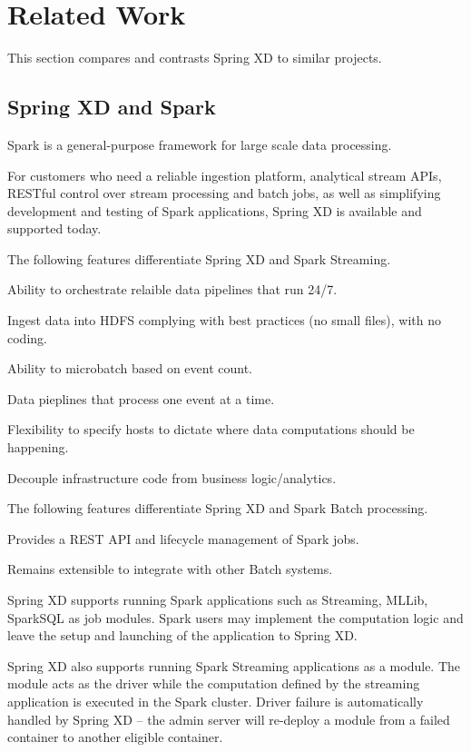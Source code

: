 \section{Related Work}
This section compares and contrasts Spring XD to similar projects.

\subsection{Spring XD and Spark}
Spark\cite{spark} is a general-purpose framework for large scale data processing.

For customers who need a reliable ingestion platform, analytical stream APIs, RESTful control over stream processing and batch jobs, as well as simplifying development and testing of Spark applications, Spring XD is available and supported today.

The following features differentiate Spring XD and Spark Streaming.

\begin{itemize*}
\item Ability to orchestrate relaible data pipelines that run 24/7.
\item Ingest data into HDFS complying with best practices (no small files), with no coding.
\item Ability to microbatch based on event count.
\item Data pieplines that process one event at a time.
\item Flexibility to specify hosts to dictate where data computations should be happening.
\item Decouple infrastructure code from business logic\slash analytics.
\end{itemize*}

The following features differentiate Spring XD and Spark Batch processing.

\begin{itemize*}
\item Provides a REST API and lifecycle management of Spark jobs.
\item Remains extensible to integrate with other Batch systems.
\end{itemize*}

Spring XD supports running Spark applications such as Streaming, MLLib, SparkSQL as job modules.
Spark users may implement the computation logic and leave the setup and launching of the
application to Spring XD.

Spring XD also supports running Spark Streaming applications as a
module. The module acts as the driver while the computation defined by the streaming application
is executed in the Spark cluster. Driver failure is automatically handled by Spring XD --
the admin server will re-deploy a module from a failed container to another eligible container.

